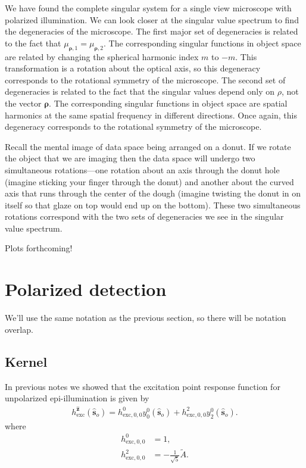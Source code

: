 \documentclass[11pt]{article}
\providecommand{\so}[1]{\mathbf{\hat{s}}_o}
\providecommand{\mh}[1]{\mathbf{\hat{#1}}}
\providecommand{\bs}[1]{\boldsymbol{#1}}
\begin{document}
We have found the complete singular system for a single view microscope with
polarized illumination. We can look closer at the singular value spectrum to
find the degeneracies of the microscope. The first major set of degeneracies is
related to the fact that $\mu_{\bs{\rho},1} = \mu_{\bs{\rho},2}$. The
corresponding singular functions in object space are related by changing the
spherical harmonic index $m$ to $-m$. This transformation is a rotation about
the optical axis, so this degeneracy corresponds to the rotational symmetry of
the microscope. The second set of degeneracies is related to the fact that the
singular values depend only on $\rho$, not the vector $\bs{\rho}$. The
corresponding singular functions in object space are spatial harmonics at the
same spatial frequency in different directions. Once again, this degeneracy
corresponds to the rotational symmetry of the microscope.

Recall the mental image of data space being arranged on a donut. If we rotate
the object that we are imaging then the data space will undergo two simultaneous
rotations---one rotation about an axis through the donut hole (imagine sticking
your finger through the donut) and another about the curved axis that runs
through the center of the dough (imagine twisting the donut in on itself so that
glaze on top would end up on the bottom). These two simultaneous rotations
correspond with the two sets of degeneracies we see in the singular value
spectrum.

Plots forthcoming!

\section{Polarized detection}
We'll use the same notation as the previous section, so there will be notation
overlap.

\subsection{Kernel}
In previous notes we showed that the excitation point response function for
unpolarized epi-illumination is given by
\begin{align}
  h_{\text{exc}}^{\mh{z}}(\so{}) = h_{\text{exc},0,0}^0y_0^0(\so{}) + h_{\text{exc},0,0}^2y_2^0(\so{}).
\end{align}
where
\begin{align}
  h_{\text{exc},0,0}^0 &= 1,\\
  h_{\text{exc},0,0}^2 &= -\frac{1}{\sqrt{5}}\tilde{A}.
\end{align}
\end{document}
